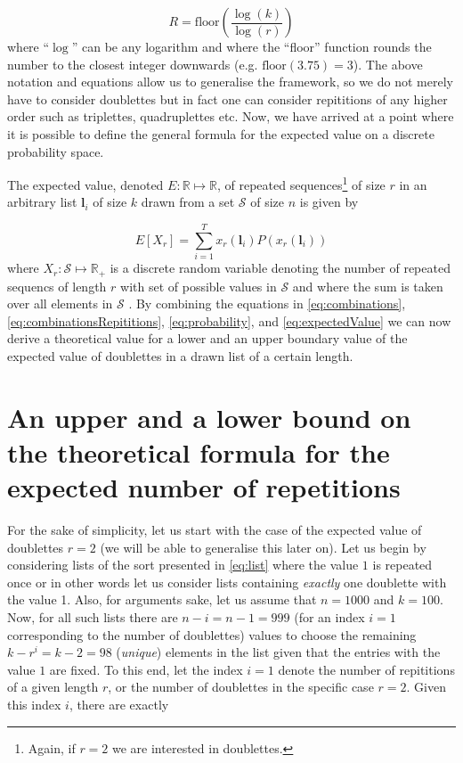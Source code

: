 \documentclass{article}
\begin{document}
\begin{equation}
R=\textrm{floor}\left(\dfrac{\log\left(k\right)}{\log\left(r\right)}\right)
\label{eq:repititions}
\end{equation}
where ``$\log$'' can be any logarithm and where the ``floor'' function rounds the number to the closest integer downwards (e.g. $\textrm{floor}(3.75)=3$). The above notation and equations allow us to generalise the framework, so we do not merely have to consider doublettes but in fact one can consider repititions of any higher order such as triplettes, quadruplettes etc. Now, we have arrived at a point where it is possible to define the general formula for the expected value on a discrete probability space.

The expected value, denoted $E:\mathbb{R}\mapsto\mathbb{R}$, of repeated sequences\footnote{Again, if $r=2$ we are interested in doublettes.} of size $r$ in an arbitrary list $\mathbf{l}_i$ of size $k$ drawn from a set $\mathcal{S}$ of size $n$ is given by

\begin{equation}
E[X_r]=\sum_{i=1}^{T}x_r(\mathbf{l}_i)P(x_r(\mathbf{l}_i))
\label{eq:expectedValue}
\end{equation}
where $X_r:\mathcal{S}\mapsto\mathbb{R}_+$ is a discrete random variable denoting the number of repeated sequencs of length $r$ with set of possible values in $\mathcal{S}$ and where the sum is taken over all elements in $\mathcal{S}$ \cite{devore2008probability,rice2006mathematical}. By combining the equations in \eqref{eq:combinations}, \eqref{eq:combinationsRepititions}, \eqref{eq:probability}, and \eqref{eq:expectedValue} we can now derive a theoretical value for a lower and an upper boundary value of the expected value of doublettes in a drawn list of a certain length. 


\section{An upper and a lower bound on the theoretical formula for the expected number of repetitions}
For the sake of simplicity, let us start with the case of the expected value of doublettes $r=2$ (we will be able to generalise this later on). Let us begin by considering lists of the sort presented in \eqref{eq:list} where the value $1$ is repeated once or in other words let us consider lists containing \textit{exactly} one doublette with the value 1. Also, for arguments sake, let us assume that $n=1000$ and $k=100$. Now, for all such lists there are $n-i=n-1=999$ (for an index $i=1$ corresponding to the number of doublettes) values to choose the remaining $k-r^i=k-2=98$ (\textit{unique}) elements in the list given that the entries with the value $1$ are fixed. To this end, let the index $i=1$ denote the number of repititions of a given length $r$, or the number of doublettes in the specific case $r=2$. Given this index $i$, there are exactly
\end{document}

